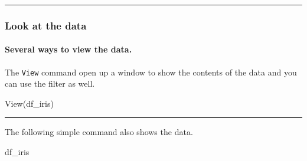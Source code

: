 \documentclass[
]{article}
\newenvironment{Shaded}{\begin{snugshade}}{\end{snugshade}}
\newcommand{\FunctionTok}[1]{\textcolor[rgb]{0.00,0.00,0.00}{#1}}
\newcommand{\NormalTok}[1]{#1}
\begin{document}
\begin{center}\rule{0.5\linewidth}{0.5pt}\end{center}

\hypertarget{look-at-the-data}{%
\subsubsection{Look at the data}\label{look-at-the-data}}

\hypertarget{several-ways-to-view-the-data.}{%
\paragraph{Several ways to view the
data.}\label{several-ways-to-view-the-data.}}

The \texttt{View} command open up a window to show the contents of the
data and you can use the filter as well.

\begin{Shaded}
\begin{Highlighting}[]
\FunctionTok{View}\NormalTok{(df\_iris)}
\end{Highlighting}
\end{Shaded}

\begin{center}\rule{0.5\linewidth}{0.5pt}\end{center}

The following simple command also shows the data.

\begin{Shaded}
\begin{Highlighting}[]
\NormalTok{df\_iris}
\end{Highlighting}
\end{Shaded}
\end{document}
